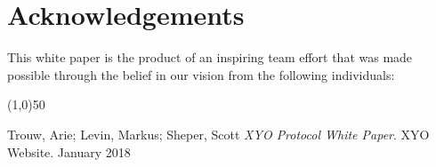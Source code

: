 \documentclass{article}
\begin{document}
\section {Acknowledgements}
This white paper is the product of an inspiring team effort that was made possible through the belief in our vision from the following individuals: 

\begin{center}
    \line(1,0){50}
\end{center}



\begin{thebibliography}{9}

    Trouw, Arie; Levin, Markus; Sheper, Scott
    \textit{XYO Protocol White Paper}.
    XYO Website. January 2018

\end{thebibliography}

\clearpage

\printglossaries

\end{document}
